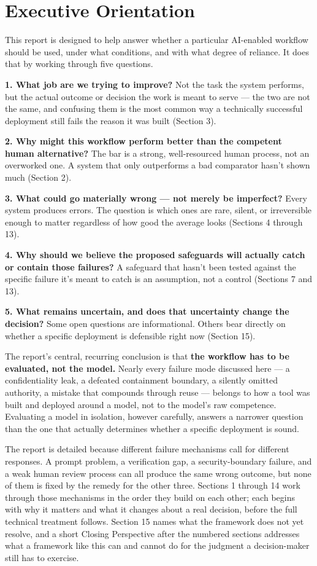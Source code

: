 \section*{Executive Orientation}

This report is designed to help answer whether a particular AI-enabled workflow should be used, under what conditions, and with what degree of reliance. It does that by working through five questions.

\textbf{1. What job are we trying to improve?} Not the task the system performs, but the actual outcome or decision the work is meant to serve --- the two are not the same, and confusing them is the most common way a technically successful deployment still fails the reason it was built (Section 3).

\textbf{2. Why might this workflow perform better than the competent human alternative?} The bar is a strong, well-resourced human process, not an overworked one. A system that only outperforms a bad comparator hasn't shown much (Section 2).

\textbf{3. What could go materially wrong --- not merely be imperfect?} Every system produces errors. The question is which ones are rare, silent, or irreversible enough to matter regardless of how good the average looks (Sections 4 through 13).

\textbf{4. Why should we believe the proposed safeguards will actually catch or contain those failures?} A safeguard that hasn't been tested against the specific failure it's meant to catch is an assumption, not a control (Sections 7 and 13).

\textbf{5. What remains uncertain, and does that uncertainty change the decision?} Some open questions are informational. Others bear directly on whether a specific deployment is defensible right now (Section 15).

The report's central, recurring conclusion is that \textbf{the workflow has to be evaluated, not the model.} Nearly every failure mode discussed here --- a confidentiality leak, a defeated containment boundary, a silently omitted authority, a mistake that compounds through reuse --- belongs to how a tool was built and deployed around a model, not to the model's raw competence. Evaluating a model in isolation, however carefully, answers a narrower question than the one that actually determines whether a specific deployment is sound.

The report is detailed because different failure mechanisms call for different responses. A prompt problem, a verification gap, a security-boundary failure, and a weak human review process can all produce the same wrong outcome, but none of them is fixed by the remedy for the other three. Sections 1 through 14 work through those mechanisms in the order they build on each other; each begins with why it matters and what it changes about a real decision, before the full technical treatment follows. Section 15 names what the framework does not yet resolve, and a short Closing Perspective after the numbered sections addresses what a framework like this can and cannot do for the judgment a decision-maker still has to exercise.
